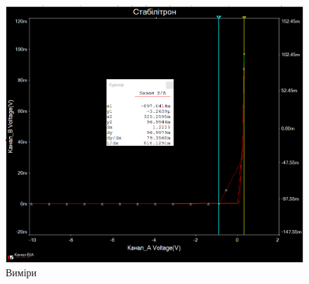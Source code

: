 \documentclass[
  ukrainian,
  14pt
]{extreport}
\begin{document}
\begin{figure}[H]
    \centering
    \includegraphics[width=.6\textwidth]{imgs/S-4.png}
    \caption{Виміри}
\end{figure}
\end{document}
